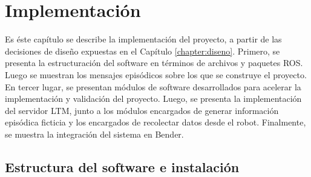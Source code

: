 \chapter{Implementación}\label{chapter:implementacion}




Es éste capítulo se describe la implementación del proyecto, a partir de las decisiones de diseño expuestas en el Capítulo \ref{chapter:diseno}. Primero, se presenta la estructuración del software en términos de archivos y paquetes ROS. Luego se muestran los mensajes episódicos sobre los que se construye el proyecto. En tercer lugar, se presentan módulos de software desarrollados para acelerar la implementación y validación del proyecto. Luego, se presenta la implementación del servidor LTM, junto a los módulos encargados de generar información episódica ficticia y los encargados de recolectar datos desde el robot. Finalmente, se muestra la integración del sistema en Bender.

\section{Estructura del software e instalación}

